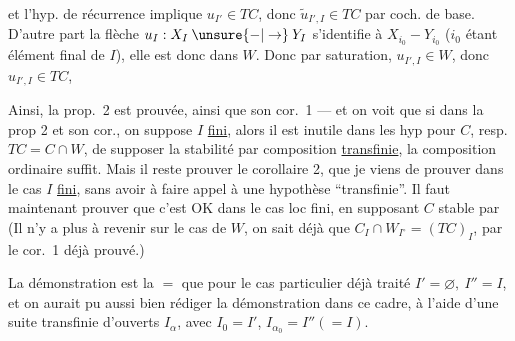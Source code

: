 

et l’hyp. de récurrence implique $u_{I'}\in TC$, donc $\widetilde u_{I',I}\in TC$ par coch. de base. D’autre part la flèche $u_I:X_I\mathbin{\unsure{-|\to}}Y_I$ s’identifie à $X_{i_0}\mathbin{-}Y_{i_0}$ ($i_0$ étant élément final de $I$), elle est donc dans $W$. Donc par saturation, $u_{I',I}\in W$, donc $u_{I',I}\in TC$, 

Ainsi, la prop.~2 est prouvée, ainsi que son cor.~1 --- et on voit que si dans la prop 2 et son cor., on suppose $I$ \uline{fini}, alors il est inutile dans les hyp pour $C$, resp. $TC=C\cap W$, de supposer la stabilité par composition \uline{transfinie}, la composition ordinaire suffit. Mais il reste  prouver le corollaire 2, que je viens de prouver dans le cas  $I$ \uline{fini}, sans avoir à faire appel à une hypothèse ``transfinie''. Il faut maintenant prouver que c’est  OK  dans le cas loc fini, en supposant $C$ stable par   \unsure{!} (Il n’y a plus à revenir sur le cas de $W$,  on sait déjà  que $C_I\cap W_{I^\circ}=(TC)_I$, par le cor.~1 déjà prouvé.)


La démonstration est  la $=$ que pour le cas particulier déjà traité $I'=\varnothing,\ I''=I$, et on aurait pu aussi bien rédiger la démonstration dans ce cadre, à l’aide d’une suite  transfinie d’ouverts  $I_\alpha$, avec $\boxed{I_0=I'}$, $I_{\alpha_0}=I''(=I)$.


